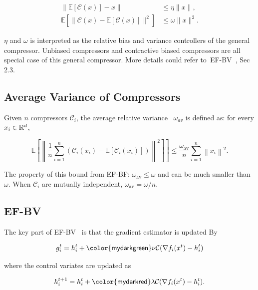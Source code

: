 \documentclass{article} %
\newcommand{\algname}[1]{{\sf\green\relscale{0.90}#1}\xspace}
\newcommand{\sybg}[1]{{\sf\green#1}\xspace}  %
\newcommand{\sybr}[1]{{\sf\red#1}\xspace}  %
\theoremstyle{plain}
\theoremstyle{definition}
\theoremstyle{remark}
\newcommand{\C}{\mathcal{C}}
\newcommand{\green}{\color{mydarkgreen}}
\newcommand{\red}{\color{mydarkred}}
\newcommand{\kai}[1]{\todo[inline]{{\textbf{Kai:} \emph{#1}}}}
\begin{document}
\begin{equation}\label{def:compressors}
   \begin{aligned}
      \|\mathbb{E}[\mathcal{C}(x)]-x\| &\leq \eta\|x\|,\\
      \mathbb{E}\left[\|\mathcal{C}(x)-\mathbb{E}[\mathcal{C}(x)]\|^{2}\right] &\leq \omega\|x\|^{2}.
   \end{aligned}
\end{equation}

$\eta$ and $\omega$ is interpreted as the relative bias and variance controllers of the general compressor. Unbiased compressors and contractive biased compressors are all special case of this general compressor. More details could refer to~\algname{EF-BV}~\cite{condat2022ef}, Sec 2.3.

\subsection{Average Variance of Compressors}
Given $n$ compressors $\C_i$, the average relative variance~\cite{condat2022ef} $\omega_{av}$ is defined as: for every $x_i\in \mathbb{R}^d$, 

\begin{equation}
   \left.\mathbb{E}\left[\left\|\frac{1}{n} \sum_{i=1}^{n}\left(\mathcal{C}_{i}\left(x_{i}\right)-\mathbb{E}\left[\mathcal{C}_{i}\left(x_{i}\right)\right]\right)\right\|^{2}\right]\right] \leq \frac{\omega_{\mathrm{av}}}{n} \sum_{i=1}^{n}\left\|x_{i}\right\|^{2}.
   \end{equation}

The property of this bound from \algname{EF-BF}: $\omega_{\mathrm{av}}\leq \omega$ and can be much smaller than $\omega$. When $\C_i$ are mutually independent, $\omega_{\mathrm{av}} = \omega / n$.


\subsection{EF-BV}
The key part of \algname{EF-BV}~\cite{condat2022ef} is that the gradient estimator is updated By

\begin{equation}
   g_i^t = h_i^t + \sybg{\nu} \C(\nabla f_i (x^t) - h_i^t)
\end{equation}

where the control variates are updated as 

\begin{equation}
   h_i^{t+1} = h_i^t + \sybr{\lambda} \C(\nabla f_i (x^t) - h_i^t).
\end{equation}
\end{document}
